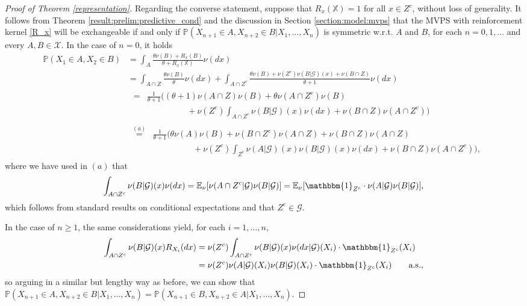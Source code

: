 \documentclass[a4paper]{article}
\theoremstyle{plain}
\theoremstyle{remark}
\theoremstyle{definition}
\begin{document}
\begin{proof}[Proof of Theorem \ref{representation}]
Regarding the converse statement, suppose that $R_x(\mathbb{X})=1$ for all $x\in Z^c$, without loss of generality. It follows from Theorem \ref{result:prelim:predictive_cond} and the discussion in Section \ref{section:model:mvps} that the MVPS with reinforcement kernel \eqref{R_x} will be exchangeable if and only if $\mathbb{P}(X_{n+1}\in A, X_{n+2}\in B| X_1, \ldots, X_n)$ is symmetric w.r.t. $A$ and $B$, for each $n=0, 1, \ldots$ and every $A, B \in \mathcal{X}$. In the case of $n=0$, it holds
\begingroup\allowdisplaybreaks
\begin{align*}
\mathbb{P}(X_1\in A,X_2\in B)&=\int_{A}\frac{\theta\nu(B)+R_x(B)}{\theta+R_x(\mathbb{X})}\nu(dx)\\
&=\int_{A\cap Z}\frac{\theta\nu(B)}{\theta}\nu(dx)+\int_{A\cap Z^c}\frac{\theta\nu(B)+\nu(Z^c)\nu(B|\mathcal{G})(x)+\nu(B\cap Z)}{\theta+1}\nu(dx)\\
&\begin{aligned}\;=&\frac{1}{\theta+1}\biggl((\theta+1)\nu(A\cap Z)\nu(B)+\theta\nu(A\cap Z^c)\nu(B)\\
&\hspace{2cm}+\nu(Z^c)\int_{A\cap Z^c}\nu(B|\mathcal{G})(x)\nu(dx)+\nu(B\cap Z)\nu(A\cap Z^c)\biggr)\end{aligned}\\
&\begin{aligned}\,\overset{(a)}{=}&\frac{1}{\theta+1}\biggl(\theta\nu(A)\nu(B)+\nu(B\cap Z^c)\nu(A\cap Z)+\nu(B\cap Z)\nu(A\cap Z)\\
&\hspace{2cm}+\nu(Z^c)\int_{Z^c}\nu(A|\mathcal{G})(x)\nu(B|\mathcal{G})(x)\nu(dx)+\nu(B\cap Z)\nu(A\cap Z^c)\biggr),\end{aligned}
\end{align*}
\endgroup
where we have used in $(a)$ that
\[\int_{A\cap Z^c}\nu(B|\mathcal{G})(x)\nu(dx)=\mathbb{E}_{\nu}[\nu(A\cap Z^c|\mathcal{G})\nu(B|\mathcal{G})]=\mathbb{E}_{\nu}[\mathbbm{1}_{Z^c}\cdot\nu(A|\mathcal{G})\nu(B|\mathcal{G})],\]
which follows from standard results on conditional expectations and that $Z^c\in\mathcal{G}$.

In the case of $n\geq 1$, the same considerations yield, for each $i=1,\ldots,n$,
\begingroup\allowdisplaybreaks
\begin{align*}
\int_{A\cap Z^c}\nu(B|\mathcal{G})(x) R_{X_i}(dx) &=\nu(Z^c)\int_{A\cap Z^c}\nu(B|\mathcal{G})(x) \nu(dx|\mathcal{G})(X_i)\cdot\mathbbm{1}_{Z^c}(X_i)\\
&=\nu(Z^c)\nu(A|\mathcal{G})(X_i)\nu(B|\mathcal{G})(X_i)\cdot\mathbbm{1}_{Z^c}(X_i)\qquad\mbox{a.s.},
\end{align*}
\endgroup
so arguing in a similar but lengthy way as before, we can show that $\mathbb{P}(X_{n+1}\in A, X_{n+2}\in B| X_1, \ldots, X_n)=\mathbb{P}(X_{n+1}\in B, X_{n+2}\in A| X_1, \ldots, X_n)$.
\end{proof}
\end{document}
